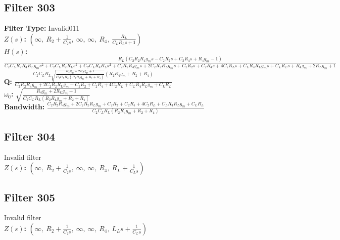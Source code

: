 \documentclass{article}
\begin{document}
\subsection*{Filter 303}
\textbf{Filter Type:} Invalid011 \\ 
\textbf{$Z(s)$:} $\left( \infty, \  R_{2} + \frac{1}{C_{2} s}, \  \infty, \  \infty, \  R_{4}, \  \frac{R_{L}}{C_{L} R_{L} s + 1}\right)$ \\ 
\textbf{$H(s)$:} $\frac{R_{L} \left(C_{2} R_{2} R_{4} g_{m} s - C_{2} R_{2} s + C_{2} R_{4} s + R_{4} g_{m} - 1\right)}{C_{2} C_{L} R_{2} R_{4} R_{L} g_{m} s^{2} + C_{2} C_{L} R_{2} R_{L} s^{2} + C_{2} C_{L} R_{4} R_{L} s^{2} + C_{2} R_{2} R_{4} g_{m} s + 2 C_{2} R_{2} R_{L} g_{m} s + C_{2} R_{2} s + C_{2} R_{4} s + 4 C_{2} R_{L} s + C_{L} R_{4} R_{L} g_{m} s + C_{L} R_{L} s + R_{4} g_{m} + 2 R_{L} g_{m} + 1}$ \\ 
\textbf{Q:} $\frac{C_{2} C_{L} R_{L} \sqrt{\frac{R_{4} g_{m} + 2 R_{L} g_{m} + 1}{C_{2} C_{L} R_{L} \left(R_{2} R_{4} g_{m} + R_{2} + R_{4}\right)}} \left(R_{2} R_{4} g_{m} + R_{2} + R_{4}\right)}{C_{2} R_{2} R_{4} g_{m} + 2 C_{2} R_{2} R_{L} g_{m} + C_{2} R_{2} + C_{2} R_{4} + 4 C_{2} R_{L} + C_{L} R_{4} R_{L} g_{m} + C_{L} R_{L}}$ \\ 
\textbf{$\omega_0$:} $\sqrt{\frac{R_{4} g_{m} + 2 R_{L} g_{m} + 1}{C_{2} C_{L} R_{L} \left(R_{2} R_{4} g_{m} + R_{2} + R_{4}\right)}}$ \\ 
\textbf{Bandwidth:} $\frac{C_{2} R_{2} R_{4} g_{m} + 2 C_{2} R_{2} R_{L} g_{m} + C_{2} R_{2} + C_{2} R_{4} + 4 C_{2} R_{L} + C_{L} R_{4} R_{L} g_{m} + C_{L} R_{L}}{C_{2} C_{L} R_{L} \left(R_{2} R_{4} g_{m} + R_{2} + R_{4}\right)}$ \\ 
\subsection*{Filter 304}
Invalid filter \\ 
\textbf{$Z(s)$:} $\left( \infty, \  R_{2} + \frac{1}{C_{2} s}, \  \infty, \  \infty, \  R_{4}, \  R_{L} + \frac{1}{C_{L} s}\right)$ \\ 
\subsection*{Filter 305}
Invalid filter \\ 
\textbf{$Z(s)$:} $\left( \infty, \  R_{2} + \frac{1}{C_{2} s}, \  \infty, \  \infty, \  R_{4}, \  L_{L} s + \frac{1}{C_{L} s}\right)$ \\ 
\end{document}
